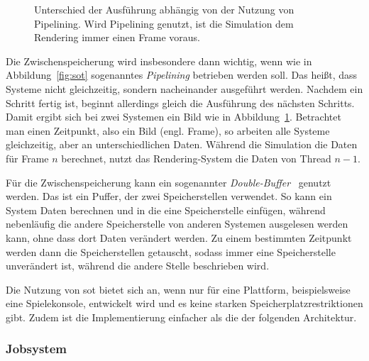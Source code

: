 \begin{figure}
	\caption[Unterschied der Ausführung abhängig von der Nutzung von Pipelining.]{Unterschied der Ausführung abhängig von der Nutzung von Pipelining. Wird Pipelining genutzt, ist die Simulation dem Rendering immer einen Frame voraus.}\label{fig:pipelining}
 \end{figure}

Die Zwischenspeicherung wird insbesondere dann wichtig, wenn wie in Abbildung~\ref{fig:sot} sogenanntes \emph{Pipelining} betrieben werden soll. Das heißt, dass Systeme nicht gleichzeitig, sondern nacheinander ausgeführt werden. Nachdem ein Schritt fertig ist, beginnt allerdings gleich die Ausführung des nächsten Schritts. Damit ergibt sich bei zwei Systemen ein Bild wie in Abbildung~\ref{fig:pipelining}. Betrachtet man einen Zeitpunkt, also ein Bild (engl. Frame), so arbeiten alle Systeme gleichzeitig, aber an unterschiedlichen Daten. Während die Simulation die Daten für Frame $n$ berechnet, nutzt das Rendering-System die Daten von Thread $n-1$.

Für die Zwischenspeicherung kann ein sogenannter \emph{Double-Buffer}~\cite[S.~143]{Nystrom2015} genutzt werden. Das ist ein Puffer, der zwei Speicherstellen verwendet. So kann ein System Daten berechnen und in die eine Speicherstelle einfügen, während nebenläufig die andere Speicherstelle von anderen Systemen ausgelesen werden kann, ohne dass dort Daten verändert werden. Zu einem bestimmten Zeitpunkt werden dann die Speicherstellen getauscht, sodass immer eine Speicherstelle unverändert ist, während die andere Stelle beschrieben wird.

Die Nutzung von \ac{sot} bietet sich an, wenn nur für eine Plattform, beispielsweise eine Spielekonsole, entwickelt wird und es keine starken Speicherplatzrestriktionen gibt. Zudem ist die Implementierung einfacher als die der folgenden Architektur.

\subsubsection{Jobsystem}\label{sec:gamesJobsystem}

